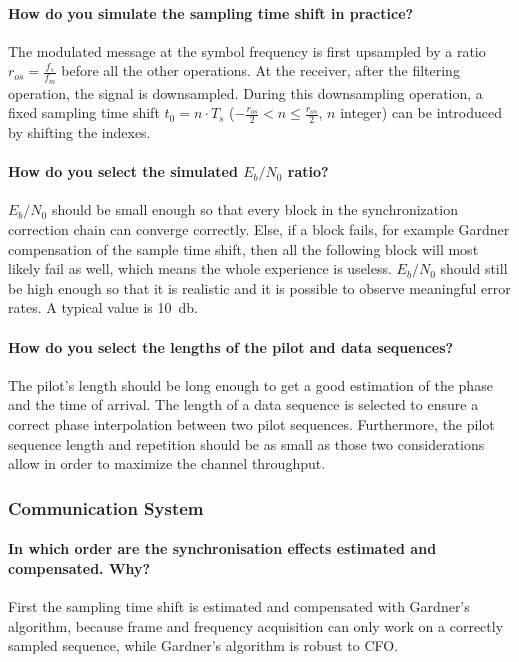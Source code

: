 \paragraph{How do you simulate the sampling time shift in practice?}The modulated message at the symbol frequency is first upsampled by a ratio $r_{os} = \frac{f_s}{f_m}$ before all the other operations.
At the receiver, after the filtering operation, the signal is downsampled.
During this downsampling operation, a fixed sampling time shift $t_0 = n \cdot T_s$ ($-\frac{r_{os}}{2} < n \leq \frac{r_{os}}{2}$, $n$ integer) can be introduced by shifting the indexes.

\paragraph{How do you select the simulated $E_{b}/N_{0}$ ratio?} $E_{b}/N_{0}$ should be small enough so that every block in the synchronization correction chain can converge correctly.
Else, if a block fails, for example Gardner compensation of the sample time shift, then all the following block will most likely fail as well, which means the whole experience is useless.
$E_{b}/N_{0}$ should still be high enough so that it is realistic and it is possible to observe meaningful error rates.
A typical value is \SI{10}{\decibel}.

\paragraph{How do you select the lengths of the pilot and data sequences?} The pilot's length should be long enough to get a good estimation of the phase and the time of arrival.
The length of a data sequence is selected to ensure a correct phase interpolation between two pilot sequences.
Furthermore, the pilot sequence length and repetition should be as small as those two considerations allow in order to maximize the channel throughput.

\subsubsection{Communication System}

\paragraph{In which order are the synchronisation effects estimated and compensated. Why?} First the sampling time shift is estimated and compensated with Gardner's algorithm, because frame and frequency acquisition can only work on a correctly sampled sequence, while Gardner's algorithm is robust to CFO.


